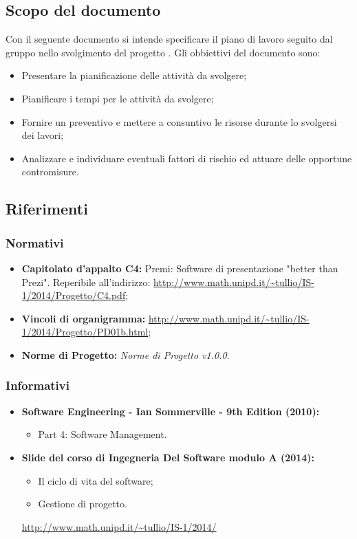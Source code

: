 \subsection{Scopo del documento}
Con il seguente documento si intende specificare il piano di lavoro seguito dal gruppo \GRUPPO{} nello svolgimento del progetto \PROGETTO{}.
Gli obbiettivi del documento sono:
\begin{itemize}
	\item Presentare la pianificazione delle attività da svolgere;
	\item Pianificare i tempi per le attività da svolgere;
	\item Fornire un preventivo e mettere a consuntivo le risorse durante lo svolgersi dei lavori;
	\item Analizzare e individuare eventuali fattori di rischio ed attuare delle opportune contromisure.
\end{itemize}

\subsection{Riferimenti}
\subsubsection{Normativi}
\begin{itemize}
	\item \textbf{Capitolato d'appalto C4:} Premi: Software di presentazione "better than Prezi". Reperibile all'indirizzo: \url{http://www.math.unipd.it/~tullio/IS-1/2014/Progetto/C4.pdf};
	\item \textbf{Vincoli di organigramma:} \url{http://www.math.unipd.it/~tullio/IS-1/2014/Progetto/PD01b.html}; 
	\item \textbf{Norme di Progetto:} \textit{Norme di Progetto v1.0.0}.
\end{itemize}
\subsubsection{Informativi}
\begin{itemize}
	\item \textbf{Software Engineering - Ian Sommerville - 9th Edition (2010):} 
	\begin{itemize}
		\item Part 4: Software Management.
	\end{itemize}
	\item \textbf{Slide del corso di Ingegneria Del Software modulo A (2014):} 
	\begin{itemize}
		\item Il ciclo di vita del software; 
		\item Gestione di progetto.
	\end{itemize}
	\url{http://www.math.unipd.it/~tullio/IS-1/2014/}
\end{itemize}


